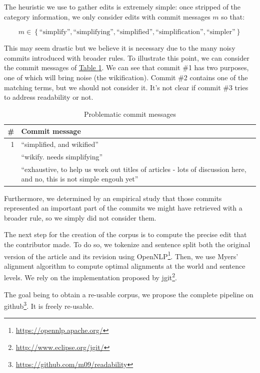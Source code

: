 \documentclass[a4paper, 11pt, onepage]{scrreprt}
\newcommand\tableref[1]{\hyperref[#1]{Table \ref*{#1}}}
\begin{document}
The heuristic we use to gather edits is extremely simple: once
stripped of the category information, we only consider edits with
commit messages $m$ so that:

\[
m \in \left\{\text{“simplify”}, \text{“simplifying”},
  \text{“simplified”}, \text{“simplification”},
  \text{“simpler”}\right\}
\]

This may seem drastic but we believe it is necessary due to the many
noisy commits introduced with broader rules. To illustrate this point,
we can consider the commit messages of
\tableref{tab:problematic-commits}. We can see that commit \#1 has two
purposes, one of which will bring noise (the wikification). Commit \#2
contains one of the matching terms, but we should not consider
it. It's not clear if commit \#3 tries to address readability or not.

\begin{table}[H]
  \centering
  \caption{Problematic commit messages}
  \begin{tabular}{rp{12cm}}
    \toprule
    \# & Commit message \\
    \midrule
    1 & “simplified, and wikified” \\
    \addlinespace
    2 & “wikify. needs simplifying” \\
    \addlinespace
    3 & “exhaustive, to help us work out titles of articles - lots of
    discussion here, and no, this is not simple engouh yet” \\
  \end{tabular}
  \label{tab:problematic-commits}
\end{table}

Furthermore, we determined by an empirical study that those commits
represented an important part of the commits we might have retrieved
with a broader rule, so we simply did not consider them.

The next step for the creation of the corpus is to compute the precise
edit that the contributor made. To do so, we tokenize and sentence
split both the original version of the article and its revision using
OpenNLP\footnote{\url{https://opennlp.apache.org/}}. Then, we use
Myers' alignment algorithm \cite{myers1988optimal} to compute optimal
alignments at the world and sentence levels. We rely on the
implementation proposed by
jgit\footnote{\url{http://www.eclipse.org/jgit/}}.

The goal being to obtain a re-usable corpus, we propose the complete
pipeline on
github\footnote{\url{https://github.com/m09/readability}}. It is
freely re-usable.
\end{document}
